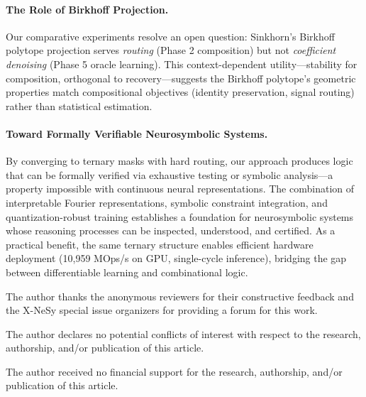 \documentclass[Royal,times,sageh]{sagej}
\begin{document}
\paragraph{The Role of Birkhoff Projection.} Our comparative experiments resolve an open question: Sinkhorn's Birkhoff polytope projection serves \textit{routing} (Phase 2 composition) but not \textit{coefficient denoising} (Phase 5 oracle learning). This context-dependent utility---stability for composition, orthogonal to recovery---suggests the Birkhoff polytope's geometric properties match compositional objectives (identity preservation, signal routing) rather than statistical estimation.

\paragraph{Toward Formally Verifiable Neurosymbolic Systems.} By converging to ternary masks with hard routing, our approach produces logic that can be formally verified via exhaustive testing or symbolic analysis---a property impossible with continuous neural representations. The combination of interpretable Fourier representations, symbolic constraint integration, and quantization-robust training establishes a foundation for neurosymbolic systems whose reasoning processes can be inspected, understood, and certified. As a practical benefit, the same ternary structure enables efficient hardware deployment (10,959 MOps/s on GPU, single-cycle inference), bridging the gap between differentiable learning and combinational logic.

\begin{acks}
The author thanks the anonymous reviewers for their constructive feedback and the X-NeSy special issue organizers for providing a forum for this work.
\end{acks}

\begin{dci}
The author declares no potential conflicts of interest with respect to the research, authorship, and/or publication of this article.
\end{dci}

\begin{funding}
The author received no financial support for the research, authorship, and/or publication of this article.
\end{funding}
\end{document}
